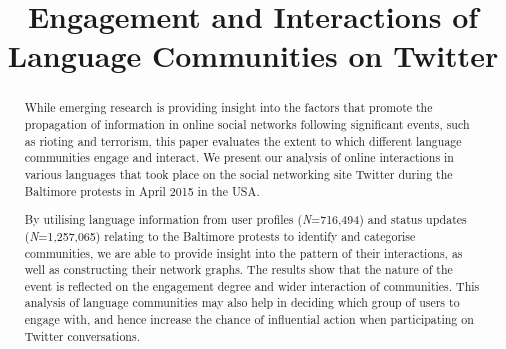 \documentclass[conference]{IEEEtran}
\begin{document}
\title{Engagement and Interactions of Language Communities on Twitter}


\author{
\and
{}
\and
{}
}



\maketitle


\begin{abstract}
While emerging research is providing insight into the factors that
promote the propagation of information in online social networks
following significant events, such as rioting and terrorism, this
paper evaluates the extent to which different language communities
engage and interact. We present our analysis of online interactions in
various languages that took place on the social networking site
Twitter during the Baltimore protests in April 2015 in the USA.

By utilising language information from user profiles
({\emph{N}}=716,494) and status updates ({\emph{N}}=1,257,065)
relating to the Baltimore protests to identify and categorise
communities, we are able to provide insight into the pattern of their
interactions, as well as constructing their network graphs. The
results show that the nature of the event is reflected on the
engagement degree and wider interaction of communities. This analysis
of language communities may also help in deciding which group of users
to engage with, and hence increase the chance of influential action
when participating on Twitter conversations.
\end{abstract}
\end{document}
